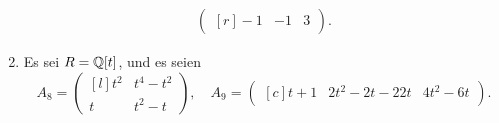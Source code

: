 \begin{question}[subtitle = Smith-Normalform]
\begin{enumerate}
\begin{gather*}
\begin{pmatrix*}[r]
           -1 & -1  & 3
        \end{pmatrix*}.
      \end{gather*}
    \item
      Es sei $R = \mathbb{Q}[t]$, und es seien
      \[
        A_8 =
        \begin{pmatrix*}[l]
          t^2 & t^4 - t^2 \\
          t   & t^2 - t
        \end{pmatrix*},
        \quad
        A_9 =
        \begin{pmatrix*}[c]
            t + 1 & 2 t^2 - 2 t - 2
          2 t     & 4 t^2 - 6 t
        \end{pmatrix*}.
      \]
  \end{enumerate}
\end{question}


